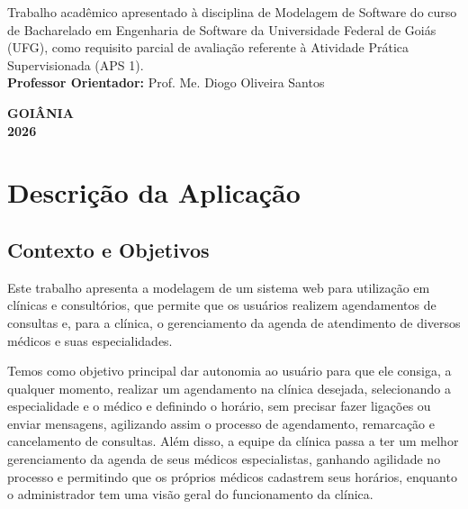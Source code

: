 \documentclass[12pt,a4paper]{article}
\begin{document}
\vspace{2.5cm}
\begin{flushright}
  \begin{minipage}{0.52\textwidth}
    \begin{singlespace}
      {\small Trabalho acadêmico apresentado à disciplina de Modelagem
      de Software do curso de Bacharelado em Engenharia de Software da
      Universidade Federal de Goiás (UFG), como requisito parcial de
      avaliação referente à Atividade Prática Supervisionada (APS
      1).\\[0.4cm]
      \textbf{Professor Orientador:} Prof. Me. Diogo Oliveira Santos}
    \end{singlespace}
  \end{minipage}
\end{flushright}

\vfill
\begin{center}
  \textbf{GOIÂNIA}\\[0.2cm]
  \textbf{2026}
\end{center}
\newpage

\thispagestyle{empty}
\renewcommand{\contentsname}{SUMÁRIO}
\pdfbookmark[0]{\contentsname}{toc}
\tableofcontents
\newpage


\pagestyle{fancy}
\thispagestyle{fancy}

\section{Descrição da Aplicação}\label{sec:descricao}

\subsection{Contexto e Objetivos}\label{sec:contexto}

Este trabalho apresenta a modelagem de um sistema web para utilização
em clínicas e consultórios, que permite que os usuários realizem
agendamentos de consultas e, para a clínica, o gerenciamento da agenda
de atendimento de diversos médicos e suas especialidades.

Temos como objetivo principal dar autonomia ao usuário para que ele
consiga, a qualquer momento, realizar um agendamento na clínica
desejada, selecionando a especialidade e o médico e definindo o horário,
sem precisar fazer ligações ou enviar mensagens, agilizando assim o
processo de agendamento, remarcação e cancelamento de consultas. Além
disso, a equipe da clínica passa a ter um melhor gerenciamento da agenda
de seus médicos especialistas, ganhando agilidade no processo e
permitindo que os próprios médicos cadastrem seus horários, enquanto o
administrador tem uma visão geral do funcionamento da clínica.
\end{document}
